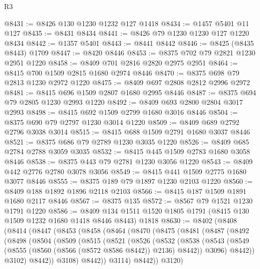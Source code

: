 \begin{lexlean}{R3}
\begin{coremodule}
@8431 := @8426 @130 @1230 @1232 @127 @1418
@8434 := @1457 @5401 @11 @127
@8435 := @8431 @8434
@8441 := @8426 @79 @1230 @1230 @127 @1220 @8434
@8442 := @1357 @5401
@8443 := @8441 @8442
@8446 := @8425 (@8435 @8443) @1709
@8447 := @8420 @8446
@8453 := @8375 @702 @79 @2821 @1230 @2951 @1220
@8458 := @8409 @701 @2816 @2820 @2975 @2951
@8464 := @8415 @700 @1509 @2815 @1680 @2974 @8446
@8470 := @8375 @698 @79 @2813 @1230 @2972 @1220
@8475 := @8409 @697 @2808 @2812 @2996 @2972
@8481 := @8415 @696 @1509 @2807 @1680 @2995 @8446
@8487 := @8375 @694 @79 @2805 @1230 @2993 @1220
@8492 := @8409 @693 @2800 @2804 @3017 @2993
@8498 := @8415 @692 @1509 @2799 @1680 @3016 @8446
@8504 := @8375 @690 @79 @2797 @1230 @3014 @1220
@8509 := @8409 @689 @2792 @2796 @3038 @3014
@8515 := @8415 @688 @1509 @2791 @1680 @3037 @8446
@8521 := @8375 @686 @79 @2789 @1230 @3035 @1220
@8526 := @8409 @685 @2784 @2788 @3059 @3035
@8532 := @8415 @445 @1509 @2783 @1680 @3058 @8446
@8538 := @8375 @443 @79 @2781 @1230 @3056 @1220
@8543 := @8409 @442 @2776 @2780 @3078 @3056
@8549 := @8415 @441 @1509 @2775 @1680 @3077 @8446
@8555 := @8375 @189 @79 @1897 @1230 @2103 @1220
@8560 := @8409 @188 @1892 @1896 @2118 @2103
@8566 := @8415 @187 @1509 @1891 @1680 @2117 @8446
@8567 := @8375 @135
@8572 := @8567 @79 @1521 @1230 @1791 @1220
@8586 := @8409 @134 @1511 @1520 @1805 @1791 (@8415 @130 @1509 @1232 @1680 @1418 @8446 @8443) @1818
@8630 := @8402
    (@8408
      (@8414
        (@8447
          (@8453
            (@8458
              (@8464
                (@8470
                  (@8475
                    (@8481
                      (@8487
                        (@8492
                          (@8498
                            (@8504
                              (@8509
                                (@8515
                                  (@8521
                                    (@8526
                                      (@8532
                                        (@8538
                                          (@8543
                                            (@8549
                                              (@8555
                                                (@8560 (@8566 (@8572 @8586 @8442)) @2136)
                                                @8442))
                                            @3096)
                                          @8442))
                                      @3102)
                                    @8442))
                                @3108)
                              @8442))
                          @3114)
                        @8442))
                    @3120)

\end{coremodule}
\end{lexlean}

